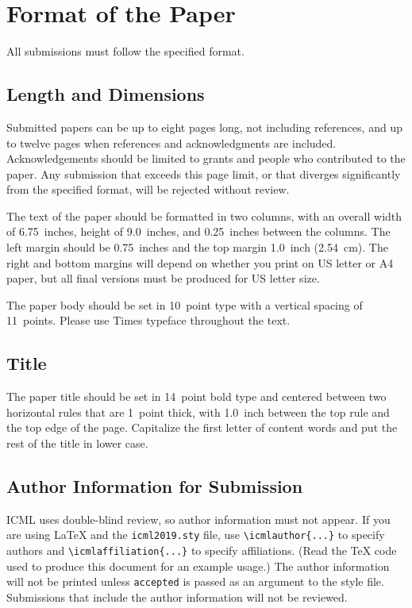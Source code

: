 \documentclass{article}
\begin{document}
\section{Format of the Paper}

All submissions must follow the specified format.

\subsection{Length and Dimensions}

Submitted papers can be up to eight pages long, not including references, and up to twelve pages when references and acknowledgments are included.
Acknowledgements should be limited to grants and people who contributed to the paper.
Any submission that exceeds
this page limit, or that diverges significantly from the specified format,
will be rejected without review.

The text of the paper should be formatted in two columns, with an
overall width of 6.75~inches, height of 9.0~inches, and 0.25~inches
between the columns. The left margin should be 0.75~inches and the top
margin 1.0~inch (2.54~cm). The right and bottom margins will depend on
whether you print on US letter or A4 paper, but all final versions
must be produced for US letter size.

The paper body should be set in 10~point type with a vertical spacing
of 11~points. Please use Times typeface throughout the text.

\subsection{Title}

The paper title should be set in 14~point bold type and centered
between two horizontal rules that are 1~point thick, with 1.0~inch
between the top rule and the top edge of the page. Capitalize the
first letter of content words and put the rest of the title in lower
case.

\subsection{Author Information for Submission}
\label{author info}

ICML uses double-blind review, so author information must not appear. If
you are using \LaTeX\/ and the \texttt{icml2019.sty} file, use
\verb+\icmlauthor{...}+ to specify authors and \verb+\icmlaffiliation{...}+ to specify affiliations. (Read the TeX code used to produce this document for an example usage.) The author information
will not be printed unless \texttt{accepted} is passed as an argument to the
style file.
Submissions that include the author information will not
be reviewed.
\end{document}

